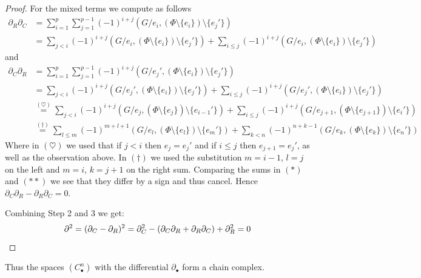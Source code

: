 \begin{proof}
	For the mixed terms we compute as follows
	\begin{align*}
		\partial_{R} \partial_{C} &=  \sum_{i=1}^{p} \sum_{j=1}^{p-1} (-1)^{i+j}(G / e_{i}, (\Phi \setminus \{e_{i}\} ) \setminus \{e_{j}'\})  \\
					   &= \sum_{j < i} (-1)^{i+j} (G / e_{i}, (\Phi \setminus \{e_{i}\} ) \setminus \{e_{j}'\}) + \sum_{i \leq j} (-1)^{i+j}
					   (G / e_{i}, (\Phi \setminus \{e_{i}\} ) \setminus \{e_{j}'\}) \tag{$*$}
	\end{align*}
	and
	\begin{align*}
		\partial_{C} \partial_{R} &=  \sum_{i=1}^{p} \sum_{j=1}^{p-1} (-1)^{i+j}(G / e_{j}', (\Phi \setminus \{e_{i}\} ) \setminus \{e_{j}'\})  \\
					   &= \sum_{j < i} (-1)^{i+j} (G / e_{j}', (\Phi \setminus \{e_{i}\} ) \setminus \{e_{j}'\}) + \sum_{i \leq j} (-1)^{i+j}
					   (G / e_{j}', (\Phi \setminus \{e_{i}\} ) \setminus \{e_{j}'\}) \\
					   &\stackrel{(\heartsuit)}{=} \sum_{j < i} (-1)^{i+j} (G / e_{j}, (\Phi \setminus \{e_{j}\} ) \setminus \{e_{i-1}'\}) + \sum_{i \leq j} (-1)^{i+j}
					   (G / e_{j+1}, (\Phi \setminus \{e_{j+1}\} ) \setminus \{e_{i}'\}) \\
					   &\stackrel{(\dagger)}{=} \sum_{l \leq m} (-1)^{m+l+1} (G / e_{l}, (\Phi \setminus \{e_{l}\} ) \setminus \{e_{m}'\}) + \sum_{k < n} (-1)^{n+k-1}
					   (G / e_{k}, (\Phi \setminus \{e_{k}\} ) \setminus \{e_{n}'\}) \tag{$* *$}
	\end{align*}
	Where in $(\heartsuit)$ we used that if $j < i$ then $e_{j} = e_{j}'$ and if $i \leq j$ then $e_{j+1} = e_{j}'$, as well as the observation above.
	In $(\dagger)$ we used the substitution  $m = i-1$,  $l = j$ on the left and  $m = i$,  $k = j+1$ on the right sum.
	Comparing the sums in $(*)$ and $(* *)$ we see that they differ by a sign and thus cancel. Hence  $\partial_{C} \partial_{R} - \partial_{R} \partial_{C} = 0$.

	Combining Step 2 and 3 we get:
	\[
		\partial^2 = (\partial_{C} - \partial_{R})^2 = \partial_{C}^2 - (\partial_{C} \partial_{R} + \partial_{R} \partial_{C}) + \partial_{R}^2 = 0\qedhere
	\]
\end{proof}

Thus the spaces $(C^{n}_{\bullet})$ with the differential $\partial_{\bullet}$ form a chain complex.

